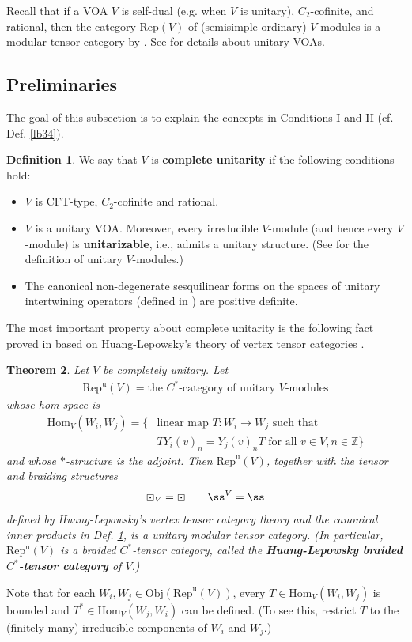 \documentclass[11pt,b5paper,notitlepage]{article}
\theoremstyle{definition}
\newtheorem{df}{Definition}[section]
\theoremstyle{plain}
\newtheorem{thm}[df]{Theorem}
\newcommand{\Hom}{\mathrm{Hom}}
\newcommand{\Rep}{\mathrm{Rep}}
\newcommand{\uni}{\mathrm{u}}
\newcommand{\RepV}{{\mathrm{Rep}^\uni(V)}}
\newcommand{\Zbb}{\mathbb Z}
\newcommand{\Obj}{\mathrm{Obj}}
\numberwithin{equation}{section}
\begin{document}
Recall that if a VOA $V$ is self-dual (e.g. when $V$ is unitary), $C_2$-cofinite, and rational, then the category $\Rep(V)$ of (semisimple ordinary) $V$-modules is a modular tensor category by \cite{Hua08a,Hua08b}. See \cite{DL14,CKLW18} for details about unitary VOAs.



\subsection{Preliminaries}



The goal of this subsection is to explain the concepts in Conditions I and II (cf. Def. \ref{lb34}).


\begin{df}\label{lb64}
We say that $V$ is \textbf{complete unitarity} if the following conditions hold:
\begin{itemize}
\item $V$ is CFT-type, $C_2$-cofinite and rational.
\item $V$ is a unitary VOA. Moreover, every irreducible $V$-module (and hence every $V$-module) is \textbf{unitarizable}, i.e., admits a unitary structure. (See \cite{DL14,Gui19a} for the definition of unitary $V$-modules.)
\item The canonical non-degenerate sesquilinear forms on the spaces of unitary intertwining operators (defined in \cite[Sec. 6]{Gui19b}) are positive definite.
\end{itemize}
\end{df}




The most important property about complete unitarity is the following fact proved in \cite[Thm. 7.9]{Gui19b} based on Huang-Lepowsky's theory of vertex tensor categories \cite{HL95a,HL95b,HL95c,Hua95,Hua05a,Hua05b,Hua08a,Hua08b}.


\begin{thm}\label{lb61}
Let $V$ be completely unitary. Let
\begin{align*}
\RepV=\text{the $C^*$-category of unitary $V$-modules}
\end{align*}
whose hom space is
\begin{align*}
\Hom_V(W_i,W_j)=\{&\text{linear map }T:W_i\rightarrow W_j\text{ such that }\\
&TY_i(v)_n=Y_j(v)_nT\text{ for all }v\in V,n\in\Zbb\}
\end{align*}
and whose $*$-structure is the adjoint. Then $\RepV$, together with the tensor and braiding structures
\begin{align*}
\boxdot_V=\boxdot\qquad \ss^V=\ss
\end{align*}
defined by Huang-Lepowsky's vertex tensor category theory and the canonical inner products in Def. \ref{lb64}, is a unitary modular tensor category. (In particular, $\RepV$ is a braided $C^*$-tensor category, called the \textbf{Huang-Lepowsky braided $C^*$-tensor category} of $V$.)
\end{thm}
Note that for each $W_i,W_j\in\Obj(\RepV)$, every $T\in\Hom_V(W_i,W_j)$ is bounded and $T^*\in\Hom_V(W_j,W_i)$ can be defined. (To see this, restrict $T$ to the (finitely many) irreducible components of $W_i$ and $W_j$.)
\end{document}
